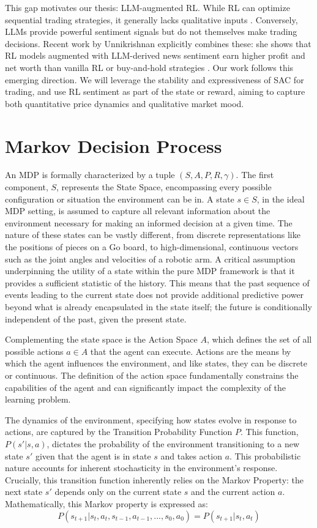 This gap motivates our thesis: \gls{LLM}-augmented \gls{RL}. While \gls{RL} can optimize sequential trading strategies, it generally lacks qualitative inputs \cite{Hambly2023}. Conversely, \gls{LLM}s provide powerful sentiment signals but do not themselves make trading decisions. Recent work by Unnikrishnan explicitly combines these: she shows that \gls{RL} models augmented with \gls{LLM}-derived news sentiment earn higher profit and net worth than vanilla \gls{RL} or buy-and-hold strategies \cite{Unnikrishnan2024}. Our work follows this emerging direction. We will leverage the stability and expressiveness of \gls{SAC} for trading, and use \gls{RL} sentiment as part of the state or reward, aiming to capture both quantitative price dynamics and qualitative market mood.

\section{Markov Decision Process}
\label{sec:mdp}
An \gls{MDP} is formally characterized by a tuple \((S, A, P, R, \gamma)\). The first component, \(S\), represents the State Space, encompassing every possible configuration or situation the environment can be in. A state \(s \in S\), in the ideal \gls{MDP} setting, is assumed to capture all relevant information about the environment necessary for making an informed decision at a given time. The nature of these states can be vastly different, from discrete representations like the positions of pieces on a Go board, to high-dimensional, continuous vectors such as the joint angles and velocities of a robotic arm. A critical assumption underpinning the utility of a state within the pure \gls{MDP} framework is that it provides a sufficient statistic of the history. This means that the past sequence of events leading to the current state does not provide additional predictive power beyond what is already encapsulated in the state itself; the future is conditionally independent of the past, given the present state.

Complementing the state space is the Action Space \(A\), which defines the set of all possible actions \(a \in A\) that the agent can execute. Actions are the means by which the agent influences the environment, and like states, they can be discrete or continuous. The definition of the action space fundamentally constrains the capabilities of the agent and can significantly impact the complexity of the learning problem.

The dynamics of the environment, specifying how states evolve in response to actions, are captured by the Transition Probability Function \(P\). This function, \(P(s' | s, a)\), dictates the probability of the environment transitioning to a new state \(s'\) given that the agent is in state \(s\) and takes action \(a\). This probabilistic nature accounts for inherent stochasticity in the environment's response. Crucially, this transition function inherently relies on the Markov Property: the next state \(s'\) depends only on the current state \(s\) and the current action \(a\). Mathematically, this Markov property is expressed as: 
\[P(s_{t+1}| s_t, a_t, s_{t-1}, a_{t-1}, ..., s_0, a_0) = P(s_{t+1} | s_t, a_t)\]

